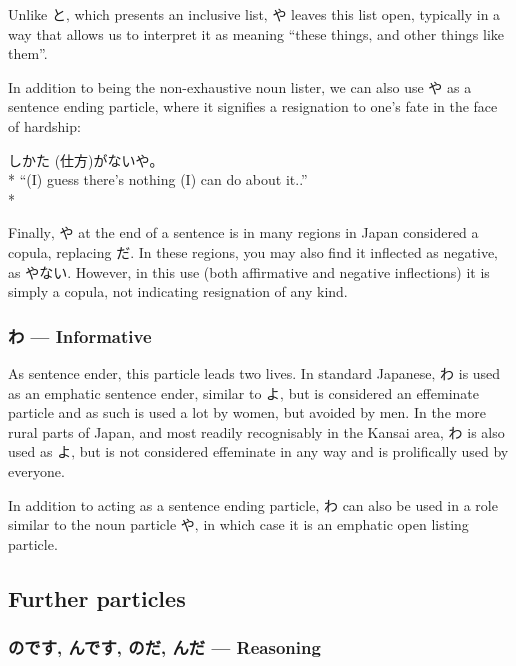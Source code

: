 \documentclass[11pt, b5paper, twoside, openright, onecolumn]{book}
\makeatletter
\newcommand*{\rubystack}[2]{{\relscale{0.5}%
  \begin{tabular}[b]{@{}c@{}}%
    {#1}\\%
   {\textscale{2}{#2}}%
  \end{tabular}}%
}
\DeclareRobustCommand*{\ruby}[2]{%
  \mbox{%
    \setlength{\parskip}{0ex}%
    \BeginAccSupp{method=pdfstringdef,ActualText={#1}}%
      \rubystack{\phantom{#2}}{#1}%
      \llap{%
        \rubystack{#2}{\phantom{#1}}%
      }%
    \EndAccSupp{}%
  }%
}
\renewcommand*{\ruby}[2]{#2 (#1)}%
\newenvironment{exampleblock}{
\setlength{\parindent}{0.6in}
\begin{minipage}[t]{\dimexpr\textwidth-\parindent}}
{\end{minipage}}
\makeatother
\begin{document}
Unlike と‚ which presents an inclusive list‚ や leaves this list open‚ typically in a way that allows us to interpret it as meaning “these things‚ and other things like them”.

In addition to being the non-exhaustive noun lister‚ we can also use や as a sentence ending particle‚ where it signifies a resignation to one’s fate in the face of hardship:

\vspace{0.4cm}
\begin{exampleblock}
\ruby{仕方}{しかた}がないや。 \\* 
“(I) guess there’s nothing (I) can do about it..” \\* 
\end{exampleblock}
\vspace{0.2cm}

Finally‚ や at the end of a sentence is in many regions in Japan considered a copula‚ replacing だ. In these regions‚ you may also find it inflected as negative‚ as やない. However‚ in this use (both affirmative and negative inflections) it is simply a copula‚ not indicating resignation of any kind.

\subsubsection{わ — Informative}

As sentence ender‚ this particle leads two lives. In standard Japanese‚ わ is used as an emphatic sentence ender‚ similar to よ‚ but is considered an effeminate particle and as such is used a lot by women‚ but avoided by men. In the more rural parts of Japan‚ and most readily recognisably in the Kansai area‚ わ is also used as よ‚ but is not considered effeminate in any way and is prolifically used by everyone.

In addition to acting as a sentence ending particle‚ わ can also be used in a role similar to the noun particle や‚ in which case it is an emphatic open listing particle.

\subsection{Further particles}

\subsubsection{のです‚ んです‚ のだ‚ んだ — Reasoning}
\end{document}
